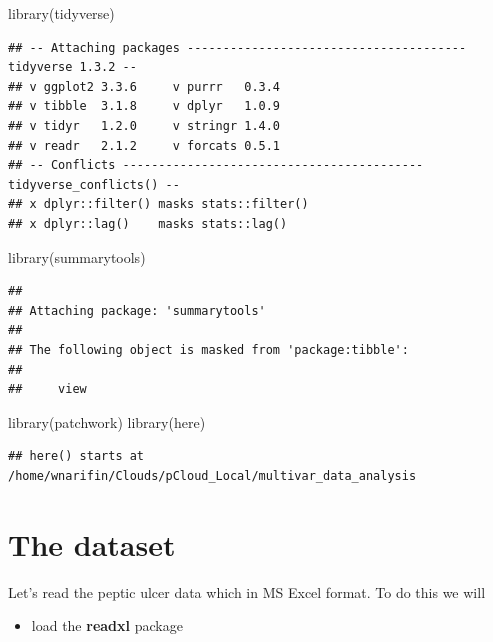 \documentclass[
  10pt,
]{krantz}
\newenvironment{Shaded}{\begin{snugshade}}{\end{snugshade}}
\newcommand{\FunctionTok}[1]{\textcolor[rgb]{0.00,0.00,0.00}{#1}}
\newcommand{\NormalTok}[1]{#1}
\providecommand{\tightlist}{%
  \setlength{\itemsep}{0pt}\setlength{\parskip}{0pt}}
\begin{document}
\begin{Shaded}
\begin{Highlighting}[]
\FunctionTok{library}\NormalTok{(tidyverse)}
\end{Highlighting}
\end{Shaded}

\begin{verbatim}
## -- Attaching packages --------------------------------------- tidyverse 1.3.2 --
## v ggplot2 3.3.6     v purrr   0.3.4
## v tibble  3.1.8     v dplyr   1.0.9
## v tidyr   1.2.0     v stringr 1.4.0
## v readr   2.1.2     v forcats 0.5.1
## -- Conflicts ------------------------------------------ tidyverse_conflicts() --
## x dplyr::filter() masks stats::filter()
## x dplyr::lag()    masks stats::lag()
\end{verbatim}

\begin{Shaded}
\begin{Highlighting}[]
\FunctionTok{library}\NormalTok{(summarytools)}
\end{Highlighting}
\end{Shaded}

\begin{verbatim}
## 
## Attaching package: 'summarytools'
## 
## The following object is masked from 'package:tibble':
## 
##     view
\end{verbatim}

\begin{Shaded}
\begin{Highlighting}[]
\FunctionTok{library}\NormalTok{(patchwork)}
\FunctionTok{library}\NormalTok{(here)}
\end{Highlighting}
\end{Shaded}

\begin{verbatim}
## here() starts at /home/wnarifin/Clouds/pCloud_Local/multivar_data_analysis
\end{verbatim}

\hypertarget{the-dataset}{%
\section{The dataset}\label{the-dataset}}

Let's read the peptic ulcer data which in MS Excel format. To do this we will

\begin{itemize}
\tightlist
\item
  load the \textbf{readxl} package
\end{itemize}
\end{document}
